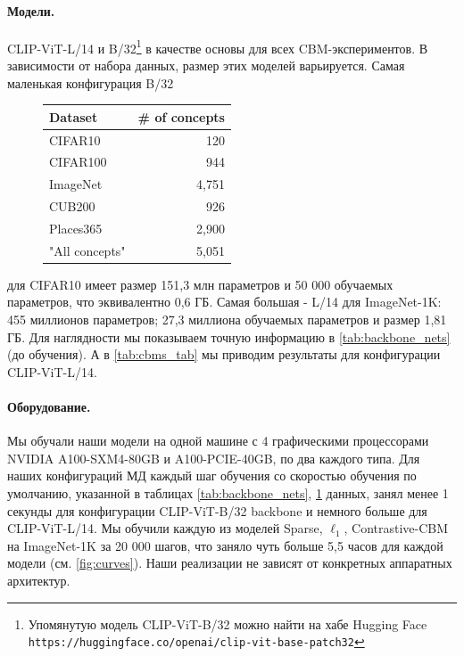 \paragraph{Модели.} CLIP-ViT-L/14 и B/32\footnote{Упомянутую модель CLIP-ViT-B/32 можно найти на хабе Hugging Face \texttt{https://huggingface.co/openai/clip-vit-base-patch32}} в качестве основы для всех CBM-экспериментов. В зависимости от набора данных, размер этих моделей варьируется. Самая маленькая конфигурация B/32
\begin{figure}%
\setcounter{table}{0}
\label{tab:concepts_size}
\begin{center}
\begin{small}
\begin{sc}
\begin{tabular}{lr}
\toprule
 Dataset & \# of concepts   \\
\midrule
CIFAR10  & 120   \\
CIFAR100 & 944 \\
ImageNet & 4,751 \\
CUB200 & 926 \\
Places365 & 2,900\\
"All concepts" & 5,051 \\
\bottomrule
\end{tabular}
\end{sc}
\end{small}
\end{center}
\end{figure}
 для CIFAR10 имеет размер 151,3 млн параметров и 50 000 обучаемых параметров, что эквивалентно 0,6 ГБ. Самая большая - L/14 для ImageNet-1K: 455 миллионов параметров; 27,3 миллиона обучаемых параметров и размер 1,81 ГБ. Для наглядности мы показываем точную информацию в \cref{tab:backbone_nets} (до обучения). А в \cref{tab:cbms_tab} мы приводим результаты для конфигурации CLIP-ViT-L/14.

\paragraph{Оборудование.}
Мы обучали наши модели на одной машине с 4 графическими процессорами NVIDIA A100-SXM4-80GB и A100-PCIE-40GB, по два каждого типа. Для наших конфигураций МД каждый шаг обучения со скоростью обучения по умолчанию, указанной в таблицах \ref{tab:backbone_nets}, \ref{tab:concepts_size} данных, занял менее 1 секунды для конфигурации CLIP-ViT-B/32 backbone и немного больше для CLIP-ViT-L/14. Мы обучили каждую из моделей Sparse, $\ell_1$, Contrastive-CBM на ImageNet-1K \cite{russakovsky2015imagenet} за 20 000 шагов, что заняло чуть больше 5,5 часов для каждой модели (см. \cref{fig:curves}). Наши реализации не зависят от конкретных аппаратных архитектур.


